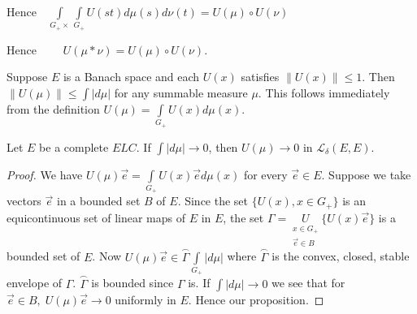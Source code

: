 \noindent Hence\pageoriginale $\quad \int\limits_{G_+\times}
\int\limits_{G_+} U(st)d\mu(s)d\nu(t) = U(\mu)\circ U(\nu)$

\noindent Hence $\qquad U(\mu * \nu) = U(\mu)\circ U(\nu)$. 

Suppose $E$ is a Banach space and each $U(x)$ satisfies $\parallel
U(x)\parallel \leq 1$. Then $\parallel U(\mu)\parallel \leq \int
|d\mu|$ for any summable measure $\mu$. This follows immediately from
the definition $U(\mu)=\int\limits_{G_+}U(x)d\mu(x)$.

\setcounter{section}{18}
\setcounter{prop}{0}
\begin{prop}\label{chap18:prop18.1}
Let $E$ be a complete $E L C$. If $\int|d\mu|\to0$, then $U(\mu) \to
0$ in $\mathscr{L}_\delta(E, E)$.
\end{prop}

\begin{proof}
We have $U(\mu)\overrightarrow{e}=\int\limits_{G_+}U(x)
\overrightarrow{e} d\mu(x)$ for every $\overrightarrow{e} \in
E$. Suppose we take vectors $\overrightarrow{e}$ in a bounded set $B$
of $E$. Since the set $\{U(x), x \in G_+\}$ is an equicontinuous set
of linear maps of $E$ in $E$, the set $\Gamma =\underset{\substack{x\in
    G_+ \\ \overrightarrow{e} \in B}}{U} \{U(x)\overrightarrow{e}\}$
is a bounded set of $E$. Now $U(\mu)\overrightarrow{e} \in
\overset{\frown}{\Gamma} \int\limits_{G_+}|d\mu|$ where
$\overset{\frown}{\Gamma}$ is the convex, closed, stable envelope of
$\Gamma$. $\overset{\frown}{\Gamma}$ is bounded since $\Gamma$ is. If
$\int |d\mu|\to 0$ we see that for $\overrightarrow{e} \in B, \;
U(\mu) \overrightarrow{e} \to 0$ uniformly in $E$. Hence our
proposition.   
\end{proof}

